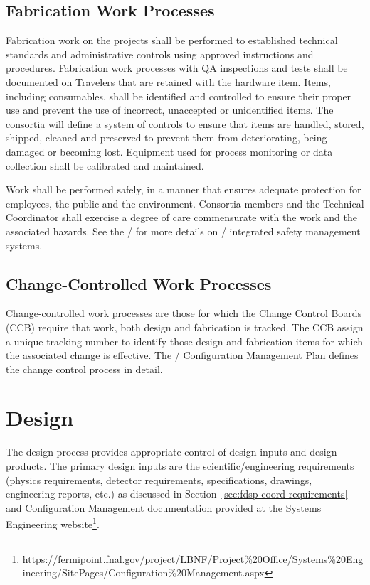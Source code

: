 \subsection{Fabrication Work Processes}

Fabrication work on the  projects shall be performed to
established technical standards and administrative controls using
approved instructions and procedures. Fabrication work processes with
QA inspections and tests shall be documented on Travelers that are
retained with the hardware item. Items, including consumables, shall
be identified and controlled to ensure their proper use and prevent
the use of incorrect, unaccepted or unidentified items. The consortia
will define a system of controls to ensure that items are handled,
stored, shipped, cleaned and preserved to prevent them from
deteriorating, being damaged or becoming lost. Equipment used for
process monitoring or data collection shall be calibrated and
maintained.

Work shall be performed safely, in a manner that ensures adequate
protection for employees, the public and the environment. Consortia
members and the  Technical Coordinator shall exercise a degree of
care commensurate with the work and the associated hazards. See the
/  for more details on /
integrated safety management systems.

\subsection{Change-Controlled Work Processes}

Change-controlled work processes are those for which the 
Change Control Boards (CCB) require that work, both design and
fabrication is tracked. The CCB assign a unique tracking number to
identify those design and fabrication items for which the associated
change is effective. The / Configuration
Management Plan defines the change control process in detail.

\section{Design}

The  design process provides appropriate control of design
inputs and design products. The primary design inputs are the
 scientific/engineering requirements (physics
requirements, detector requirements, specifications, drawings,
engineering reports, etc.) as discussed in
Section~\ref{sec:fdsp-coord-requirements} and Configuration Management
documentation provided at the Systems Engineering
website\footnote{https://fermipoint.fnal.gov/project/LBNF/Project\%20Office/Systems\%20Engineering/SitePages/Configuration\%20Management.aspx}.

